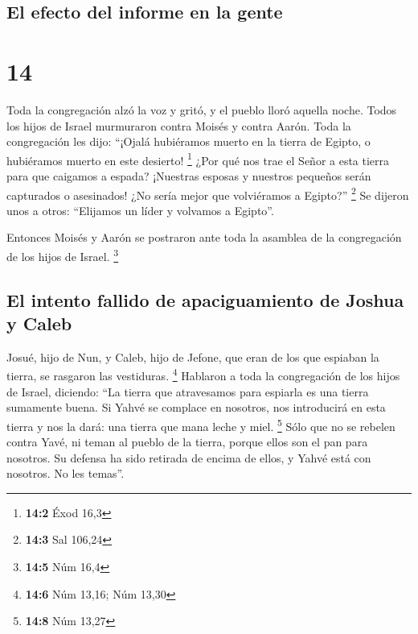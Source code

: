 \hypertarget{el-efecto-del-informe-en-la-gente}{%
\subsection{El efecto del informe en la
gente}\label{el-efecto-del-informe-en-la-gente}}

\hypertarget{section-13}{%
\section{14}\label{section-13}}

 Toda la congregación alzó la voz y gritó, y el pueblo
lloró aquella noche.  Todos los hijos de Israel murmuraron
contra Moisés y contra Aarón. Toda la congregación les dijo: ``¡Ojalá
hubiéramos muerto en la tierra de Egipto, o hubiéramos muerto en este
desierto! \footnote{\textbf{14:2} Éxod 16,3}  ¿Por qué nos
trae el Señor a esta tierra para que caigamos a espada? ¡Nuestras
esposas y nuestros pequeños serán capturados o asesinados! ¿No sería
mejor que volviéramos a Egipto?'' \footnote{\textbf{14:3} Sal 106,24}
 Se dijeron unos a otros: ``Elijamos un líder y volvamos a
Egipto''.

 Entonces Moisés y Aarón se postraron ante toda la
asamblea de la congregación de los hijos de Israel. \footnote{\textbf{14:5}
  Núm 16,4}

\hypertarget{el-intento-fallido-de-apaciguamiento-de-joshua-y-caleb}{%
\subsection{El intento fallido de apaciguamiento de Joshua y
Caleb}\label{el-intento-fallido-de-apaciguamiento-de-joshua-y-caleb}}

 Josué, hijo de Nun, y Caleb, hijo de Jefone, que eran de
los que espiaban la tierra, se rasgaron las vestiduras. \footnote{\textbf{14:6}
  Núm 13,16; Núm 13,30}  Hablaron a toda la congregación
de los hijos de Israel, diciendo: ``La tierra que atravesamos para
espiarla es una tierra sumamente buena.  Si Yahvé se
complace en nosotros, nos introducirá en esta tierra y nos la dará: una
tierra que mana leche y miel. \footnote{\textbf{14:8} Núm 13,27}
 Sólo que no se rebelen contra Yavé, ni teman al pueblo de
la tierra, porque ellos son el pan para nosotros. Su defensa ha sido
retirada de encima de ellos, y Yahvé está con nosotros. No les temas''.

